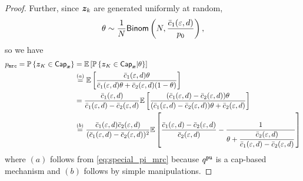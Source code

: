 \begin{proof}
Further, since ${\boldsymbol{z}}_k$ are generated uniformly at random,
$$ \theta \sim \frac{1}{N} \mathsf{Binom}\left( N, \frac{ \bar{c}_1(\varepsilon, d)}{p_0}\right),$$ so we have
\begin{align}
    p_{\texttt{mrc}} = \mathbb{P}\left\{ {\boldsymbol{z}}_K \in \mathsf{Cap}_{{\boldsymbol{x}}} \right\}  & = \mathbb{E}\left[ \mathbb{P}\left\{ {\boldsymbol{z}}_K \in \mathsf{Cap}_{{\boldsymbol{x}}}| \theta \right\} \right]  \\
    & \stackrel{(a)}{=} \mathbb{E}\left[ \frac{ \bar{c}_1(\varepsilon, d) \theta}{ \bar{c}_1(\varepsilon, d) \theta +  \bar{c}_2(\varepsilon, d)(1-\theta)} \right] \\
    & = \frac{ \bar{c}_1(\varepsilon, d)}{ \bar{c}_1(\varepsilon, d)- \bar{c}_2(\varepsilon, d)}\mathbb{E}\left[ \frac{( \bar{c}_1(\varepsilon, d) -  \bar{c}_2(\varepsilon, d))\theta}{( \bar{c}_1(\varepsilon, d) -  \bar{c}_2(\varepsilon, d))\theta +  \bar{c}_2(\varepsilon, d)} \right] \\
    & \stackrel{(b)}{=} \frac{ \bar{c}_1(\varepsilon, d) \bar{c}_2(\varepsilon, d)}{( \bar{c}_1(\varepsilon, d)- \bar{c}_2(\varepsilon, d))^2}\mathbb{E}\left[ \frac{ \bar{c}_1(\varepsilon, d)- \bar{c}_2(\varepsilon, d)}{ \bar{c}_2(\varepsilon, d)}-\frac{1}{\theta+\dfrac{ \bar{c}_2(\varepsilon, d)}{ \bar{c}_1(\varepsilon, d)- \bar{c}_2(\varepsilon, d)}} \right]
\label{eq:mrc_privunit_approximation_error_2}
\end{align}
where $(a)$ follows from \eqref{eq:special_pi_mrc} because $q^{\texttt{pu}}$ is a cap-based mechanism and $(b)$ follows by simple manipulations. 


\end{proof}

